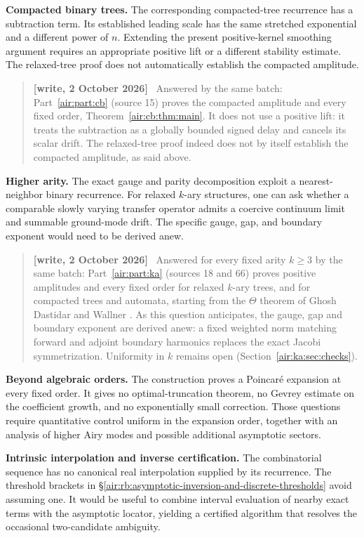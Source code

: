 \documentclass[11pt,letterpaper]{article}
\numberwithin{equation}{section}
\theoremstyle{remark}
\newenvironment{writenote}{\par\smallskip\begin{quote}\small\textbf{[write, 2 October 2026]}\ }{\end{quote}\smallskip}
\begin{document}
\textbf{Compacted binary trees.} The corresponding compacted-tree recurrence has a subtraction term. Its established leading scale has the same stretched exponential and a different power of \(n\). Extending the present positive-kernel smoothing argument requires an appropriate positive lift or a different stability estimate. The relaxed-tree proof does not automatically establish the compacted amplitude.
\begin{writenote}
Answered by the same batch: Part~\ref{air:part:cb} (source 15) proves the compacted amplitude and every fixed order, Theorem~\ref{air:cb:thm:main}. It does not use a positive lift: it treats the subtraction as a globally bounded signed delay and cancels its scalar drift. The relaxed-tree proof indeed does not by itself establish the compacted amplitude, as said above.
\end{writenote}


\textbf{Higher arity.} The exact gauge and parity decomposition exploit a nearest-neighbor binary recurrence. For relaxed \(k\)-ary structures, one can ask whether a comparable slowly varying transfer operator admits a coercive continuum limit and summable ground-mode drift. The specific gauge, gap, and boundary exponent would need to be derived anew.
\begin{writenote}
Answered for every fixed arity $k\ge3$ by the same batch: Part~\ref{air:part:ka} (sources 18 and 66) proves positive amplitudes and every fixed order for relaxed $k$-ary trees, and for compacted trees and automata, starting from the $\Theta$ theorem of Ghosh Dastidar and Wallner \cite{gdw}. As this question anticipates, the gauge, gap and boundary exponent are derived anew: a fixed weighted norm matching forward and adjoint boundary harmonics replaces the exact Jacobi symmetrization. Uniformity in $k$ remains open (Section~\ref{air:ka:sec:checks}).
\end{writenote}


\textbf{Beyond algebraic orders.} The construction proves a Poincaré expansion at every fixed order. It gives no optimal-truncation theorem, no Gevrey estimate on the coefficient growth, and no exponentially small correction. Those questions require quantitative control uniform in the expansion order, together with an analysis of higher Airy modes and possible additional asymptotic sectors.

\textbf{Intrinsic interpolation and inverse certification.} The combinatorial sequence has no canonical real interpolation supplied by its recurrence. The threshold brackets in \S\ref{air:rb:asymptotic-inversion-and-discrete-thresholds} avoid assuming one. It would be useful to combine interval evaluation of nearby exact terms with the asymptotic locator, yielding a certified algorithm that resolves the occasional two-candidate ambiguity.
\end{document}
